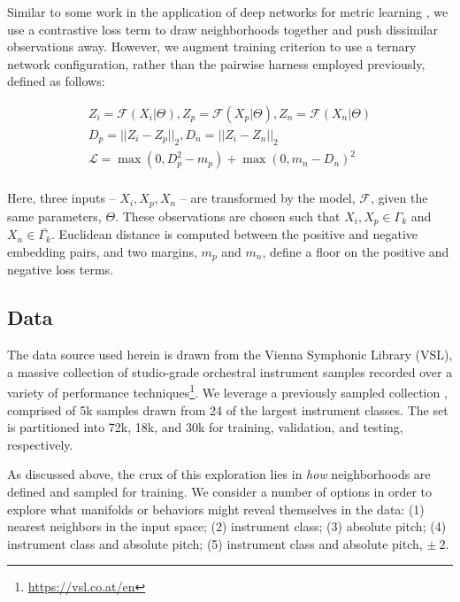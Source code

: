 \documentclass{article}
\begin{document}
Similar to some work in the application of deep networks for metric learning \cite{hadsell2006drlim, humphrey2011nlse, humphrey2015dl4mir}, we use a contrastive loss term to draw neighborhoods together and push dissimilar observations away.
However, we augment training criterion to use a ternary network configuration, rather than the pairwise harness employed previously, defined as follows:

\begin{align*}
Z_i = \mathcal{F}(X_i | \Theta), Z_p = \mathcal{F}(X_p | \Theta), Z_n = \mathcal{F}(X_n | \Theta)\\
D_p = || Z_i - Z_p ||_2, D_n = || Z_i - Z_n ||_2\\
\mathcal{L} = \max(0, D_p^2 - m_{p}) + \max(0, m_{n} - D_n)^2 \\
\end{align*}

Here, three inputs -- $X_i, X_p, X_n$ -- are transformed by the model, $\mathcal{F}$, given the same parameters, $\Theta$.
These observations are chosen such that $X_i, X_p \in \Gamma_k$ and $X_n \in \bar{\Gamma_k}$.
Euclidean distance is computed between the positive and negative embedding pairs, and two margins, $m_p$ and $m_n$, define a floor on the positive and negative loss terms.

\subsection{Data}

The data source used herein is drawn from the Vienna Symphonic Library (VSL), a massive collection of studio-grade orchestral instrument samples recorded over a variety of performance techniques\footnote{\url{https://vsl.co.at/en}}.
We leverage a previously sampled collection \cite{humphrey2015dl4mir}, comprised of 5k samples drawn from 24 of the largest instrument classes.
The set is partitioned into 72k, 18k, and 30k for training, validation, and testing, respectively.

As discussed above, the crux of this exploration lies in \emph{how} neighborhoods are defined and sampled for training.
We consider a number of options in order to explore what manifolds or behaviors might reveal themselves in the data:
(1) nearest neighbors in the input space;
(2) instrument class;
(3) absolute pitch;
(4) instrument class and absolute pitch;
(5) instrument class and absolute pitch, $\pm~2$.
\end{document}
